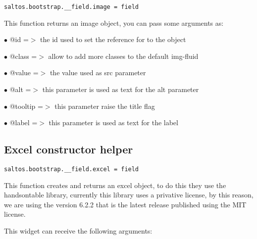 \documentclass[a4paper]{book}
\begin{document}
\begin{lstlisting}
saltos.bootstrap.__field.image = field
\end{lstlisting}

This function returns an image object, you can pass some arguments as:

\begin{compactitem}
\item[\color{myblue}$\bullet$] @id      =$>$ the id used to set the reference for to the object
\item[\color{myblue}$\bullet$] @class   =$>$ allow to add more classes to the default img-fluid
\item[\color{myblue}$\bullet$] @value   =$>$ the value used as src parameter
\item[\color{myblue}$\bullet$] @alt     =$>$ this parameter is used as text for the alt parameter
\item[\color{myblue}$\bullet$] @tooltip =$>$ this parameter raise the title flag
\item[\color{myblue}$\bullet$] @label   =$>$ this parameter is used as text for the label
\end{compactitem}

\hypertarget{toc457}{}
\subsection{Excel constructor helper}

\begin{lstlisting}
saltos.bootstrap.__field.excel = field
\end{lstlisting}

This function creates and returns an excel object, to do this they use the handsontable library,
currently this library uses a privative license, by this reason, we are using the version 6.2.2
that is the latest release published using the MIT license.

This widget can receive the following arguments:
\end{document}
